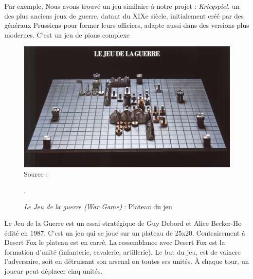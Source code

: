 Par exemple, Nous avons trouvé un jeu similaire à notre projet : \textit{Kriegspiel}, un des plus anciens jeux de guerre, datant du XIXe siècle, initialement créé par des généraux Prussiens pour former leurs officiers, adapte aussi dans des versions plus modernes.
C'est un jeu de pions complexe   \cite{livermore1879american}
\begin{figure}[H]
    \centering
    \includegraphics[scale=1.0]{data/Cavalry_at_dusk.jpg}\\

    Source : 
    \caption{\textit{Le Jeu de la guerre (War Game)} : Plateau du jeu}.

\end{figure}

Le Jeu de la Guerre \cite{frwiki:189457170} est un essai stratégique de Guy Debord et Alice Becker-Ho édité en 1987.
C'est un jeu qui se joue sur un plateau de 25x20. Contrairement à Desert Fox le plateau est en carré. La ressemblance avec Desert Fox est la formation d'unité (infanterie, cavalerie, artillerie).
Le but du jeu, est de vaincre l'adversaire, soit en détruisant son arsenal ou toutes ses unités. À chaque tour, un joueur peut déplacer cinq unités.


